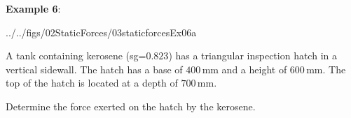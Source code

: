 \documentclass[10pt,onesided]{amsart}
\begin{document}
\begin{minipage}[t]{0.45\textwidth}
	\textbf{Example 6}:\\
	\begin{cfig}[0.65]{../../figs/02StaticForces/03staticforcesEx06a}\end{cfig}
	\raggedright
	A tank containing kerosene (sg=$0.823$) has a triangular inspection hatch in a vertical sidewall. The hatch has
	a base of $400\,\text{mm}$ and a height of $600\,\text{mm}$. The top of the hatch is located at a depth of $700\,\text{mm}$.
	\par\smallskip
	Determine the force exerted on the hatch by the kerosene.
\end{minipage}

\newpage
\end{document}
